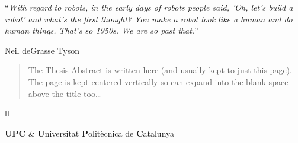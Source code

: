 \documentclass[
12pt, %
english, %
singlespacing, %
liststotoc, %
toctotoc, %
headsepline, %
]{MastersDoctoralThesis} %
\begin{document}
\cleardoublepage


\vspace*{0.2\textheight}

\noindent\enquote{\itshape With regard to robots, in the early days of robots people said, 'Oh, let's build a robot' and what's the first thought? You make a robot look like a human and do human things. That's so 1950s. We are so past that.}\bigbreak

\hfill Neil deGrasse Tyson


\begin{abstract}
\addchaptertocentry{\abstractname} %
The Thesis Abstract is written here (and usually kept to just this page). The page is kept centered vertically so can expand into the blank space above the title too\ldots
\end{abstract}


\tableofcontents %

\listoffigures %

\listoftables %


\begin{abbreviations}{ll} %

\textbf{UPC} & \textbf{U}niversitat \textbf{P}olitècnica de \textbf{C}atalunya\\

\end{abbreviations}
\end{document}
